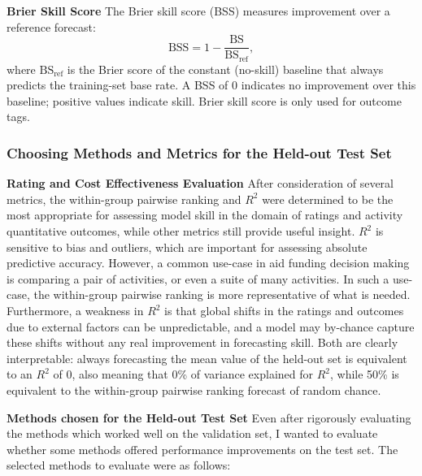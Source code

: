 \textbf{Brier Skill Score}
The Brier skill score (BSS) measures improvement over a reference forecast:
\[
  \mathrm{BSS} = 1 - \frac{\mathrm{BS}}{\mathrm{BS}_{\mathrm{ref}}},
\]
where $\mathrm{BS}_{\mathrm{ref}}$ is the Brier score of the constant (no-skill) baseline that always predicts the training-set base rate. A BSS of 0 indicates no improvement over this baseline; positive values indicate skill. Brier skill score is only used for outcome tags.


\subsubsection{Choosing Methods and Metrics for the Held-out Test Set}
\textbf{Rating and Cost Effectiveness Evaluation} After consideration of several metrics, the within-group pairwise ranking and $R^2$ were determined to be the most appropriate for assessing model skill in the domain of ratings and activity quantitative outcomes, while other metrics still provide useful insight. $R^2$ is sensitive to bias and outliers, which are important for assessing absolute predictive accuracy. However, a common use-case in aid funding decision making is comparing a pair of activities, or even a suite of many activities. In such a use-case, the within-group pairwise ranking is more representative of what is needed. Furthermore, a weakness in $R^2$ is that global shifts in the ratings and outcomes due to external factors can be unpredictable, and a model may by-chance capture these shifts without any real improvement in forecasting skill. Both are clearly interpretable: always forecasting the mean value of the held-out set is equivalent to an $R^2$ of 0, also meaning that 0\% of variance explained for $R^2$, while 50\% is equivalent to the within-group pairwise ranking forecast of random chance.

\textbf{Methods chosen for the Held-out Test Set} Even after rigorously evaluating the methods which worked well on the validation set, I wanted to evaluate whether some methods offered performance improvements on the test set. The selected methods to evaluate were as follows:

